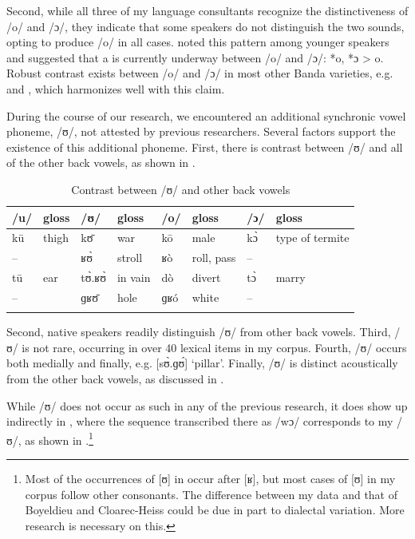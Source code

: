 \documentclass[output=paper,colorlinks,citecolor=brown]{langscibook}
\begin{document}
Second, while all three of my language consultants recognize the distinctiveness of /o/ and /ɔ/, they indicate that some  speakers do not distinguish the two sounds, opting to produce /o/ in all cases. \citet[9]{Théret-Kieschke1998} noted this pattern among younger speakers and suggested that a  is currently underway between /o/ and /ɔ/: *o, *ɔ > o. Robust contrast exists between /o/ and /ɔ/ in most other Banda  varieties, e.g.  \citep{BoyeldieuCloarec-Heiss2001} and  \citep{Olson2005}, which harmonizes well with this claim.

During the course of our research, we encountered an additional synchronic vowel phoneme, /ʊ/, not attested by previous researchers. Several factors support the existence of this additional phoneme. First, there is contrast between /ʊ/ and all of the other back vowels, as shown in .

\begin{table}
\caption{Contrast between /ʊ/ and other back vowels}
\label{tab:olson:8}
    \begin{tabular}{llllllll}
    \lsptoprule
        /u/     & gloss & /ʊ/ & gloss & /o/ & gloss & /ɔ/ & gloss\\
    \midrule
        kū      & thigh & kʊ̄ & war & kō & male & kɔ̀ & type of termite\\
        --     & & ʁʊ̀ & stroll & ʁò & roll, pass & -- & \\
        tū      & ear & tʊ̀.ʁʊ̀ & in vain & dò & divert & tɔ̀ & marry\\
        --     & & ɡʁʊ̄ & hole & ɡʁó & white & -- & \\
    \lspbottomrule
    \end{tabular}
\end{table}

Second, native speakers readily distinguish /ʊ/ from other back vowels. Third, /ʊ/ is not rare, occurring in over 40 lexical items in my corpus. Fourth, /ʊ/ occurs both medially and finally, e.g. [sʊ̀.ɡʊ́] ‘pillar’. Finally, /ʊ/ is distinct acoustically from the other back vowels, as discussed in .

While /ʊ/ does not occur as such in any of the previous research, it does show up indirectly in \citet{BoyeldieuCloarec-Heiss2001}, where the sequence transcribed there as /wɔ/ corresponds to my /ʊ/, as shown in .\footnote{Most of the occurrences of [ʊ] in  occur after [ʁ], but most cases of [ʊ] in my corpus follow other consonants. The difference between my data and that of Boyeldieu and Cloarec-Heiss could be due in part to dialectal variation. More research is necessary on this.}
\end{document}
